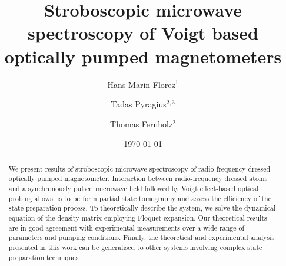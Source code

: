 \documentclass[%
reprint,
 amsmath,amssymb,
 aps,
floatfix,
]{revtex4-1}
\begin{document}

\title{Stroboscopic microwave spectroscopy of Voigt based optically pumped magnetometers}
\author{Hans Marin Florez$^{1}$}
\author{Tadas Pyragius$^{2,3}$}
\author{Thomas Fernholz$^{2}$}




\date{\today}%

\begin{abstract}
We present results of stroboscopic microwave spectroscopy of radio-frequency dressed optically pumped magnetometer. Interaction between radio-frequency dressed atoms and a synchronously pulsed microwave field followed by Voigt effect-based optical probing allows us to perform partial state tomography and assess the efficiency of the state preparation process. To theoretically describe the system, we solve the dynamical equation of the density matrix employing Floquet expansion. Our theoretical results are in good agreement with experimental measurements over a wide range of parameters and pumping conditions. Finally, the theoretical and experimental analysis presented in this work can be generalised to other systems involving complex state preparation techniques.
\end{abstract}

\maketitle



\end{document}
